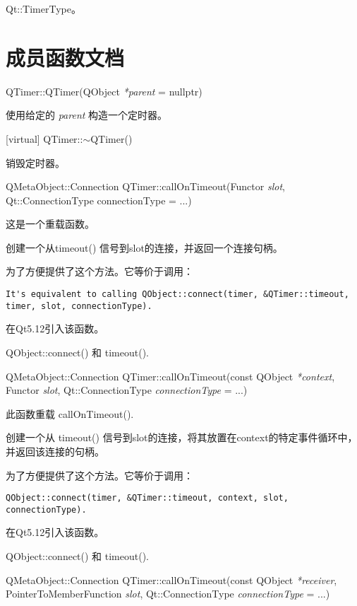 \begin{notice}[另请参阅]
 Qt::TimerType。
\end{notice}

\section{成员函数文档}

QTimer::QTimer(QObject \emph{*parent} = nullptr)

使用给定的 \emph{parent} 构造一个定时器。

[virtual] QTimer::$\sim$QTimer()

销毁定时器。

QMetaObject::Connection QTimer::callOnTimeout(Functor \emph{slot}, Qt::ConnectionType connectionType = ...)

这是一个重载函数。

创建一个从timeout() 信号到slot的连接，并返回一个连接句柄。

为了方便提供了这个方法。它等价于调用：

\begin{lstlisting}
It's equivalent to calling QObject::connect(timer, &QTimer::timeout, timer, slot, connectionType).
\end{lstlisting}

在Qt5.12引入该函数。

\begin{notice}[另请参阅]
QObject::connect() 和 timeout().
\end{notice}

QMetaObject::Connection QTimer::callOnTimeout(const QObject \emph{*context}, Functor \emph{slot}, Qt::ConnectionType \emph{connectionType} = ...)

此函数重载 callOnTimeout().

创建一个从 timeout() 信号到slot的连接，将其放置在context的特定事件循环中，并返回该连接的句柄。

为了方便提供了这个方法。它等价于调用：


\begin{lstlisting}
QObject::connect(timer, &QTimer::timeout, context, slot, connectionType).
\end{lstlisting}
	
在Qt5.12引入该函数。
	
\begin{notice}[另请参阅]
QObject::connect() 和 timeout().
\end{notice}

QMetaObject::Connection QTimer::callOnTimeout(const QObject \emph{*receiver}, PointerToMemberFunction \emph{slot}, Qt::ConnectionType \emph{connectionType} = ...)

